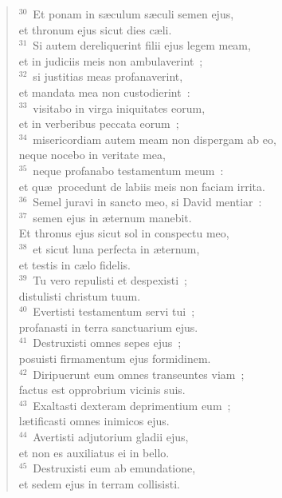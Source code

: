 \begin{flushleft}
\begin{verse}
${}^{30}$~Et ponam in s\ae culum s\ae culi semen ejus,\\ et thronum ejus sicut dies c\ae li.\\
${}^{31}$~Si autem dereliquerint filii ejus legem meam,\\ et in judiciis meis non ambulaverint~;\\
${}^{32}$~si justitias meas profanaverint,\\ et mandata mea non custodierint~:\\
${}^{33}$~visitabo in virga iniquitates eorum,\\ et in verberibus peccata eorum~;\\
${}^{34}$~misericordiam autem meam non dispergam ab eo,\\ neque nocebo in veritate mea,\\
${}^{35}$~neque profanabo testamentum meum~:\\ et qu\ae\ procedunt de labiis meis non faciam irrita.\\
${}^{36}$~Semel juravi in sancto meo, si David mentiar~:\\
${}^{37}$~semen ejus in \ae ternum manebit.\\ Et thronus ejus sicut sol in conspectu meo,\\
${}^{38}$~et sicut luna perfecta in \ae ternum,\\ et testis in c\ae lo fidelis.\\
${}^{39}$~Tu vero repulisti et despexisti~;\\ distulisti christum tuum.\\
${}^{40}$~Evertisti testamentum servi tui~;\\ profanasti in terra sanctuarium ejus.\\
${}^{41}$~Destruxisti omnes sepes ejus~;\\ posuisti firmamentum ejus formidinem.\\
${}^{42}$~Diripuerunt eum omnes transeuntes viam~;\\ factus est opprobrium vicinis suis.\\
${}^{43}$~Exaltasti dexteram deprimentium eum~;\\ l\ae tificasti omnes inimicos ejus.\\
${}^{44}$~Avertisti adjutorium gladii ejus,\\ et non es auxiliatus ei in bello.\\
${}^{45}$~Destruxisti eum ab emundatione,\\ et sedem ejus in terram collisisti.\\

\end{verse}
\end{flushleft}
